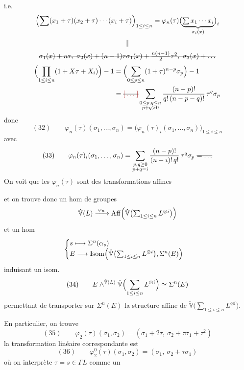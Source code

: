 \documentclass[11pt,a4paper]{article}
\begin{document}
i.e.
\[
\Bigl(\sum (x_1 + \tau)(x_2 + \tau) \cdots (x_i + \tau)\Bigr)_{1 \le i \le n} = \varphi_n(\tau)\bigl(\underbrace{\textstyle\sum x_1 \cdots x_i}_{\sigma_i(x)}\bigr)_i
\]
\[
\Vert
\]
\[
\text{\struck{$\sigma_1(x) + n\tau,\ \sigma_2(x) + (n-1)\tau\sigma_1(x) + \tfrac{n(n-1)}{2}\tau^2,\ \sigma_3(x) + \ldots$}}
\]
\[
\begin{aligned}
\Bigl(\prod_{1 \le i \le n} (1 + X\tau + X_i)\Bigr) - 1 &= \Bigl(\sum_{0 \le p \le n} (1 + \tau)^{n-p}\sigma_p\Bigr) - 1\\
&= \text{\struck{\ill{}}} \sum_{\substack{0 \le p, q \le n\\ p + q > 0}} \frac{(n-p)!}{q!\,(n-p-q)!}\,\tau^q\sigma_p
\end{aligned}
\]
donc
\[
(32)\qquad \varphi_n(\tau)(\sigma_1, \ldots, \sigma_n) = \bigl(\varphi_n(\tau)_i(\sigma_1, \ldots, \sigma_n)\bigr)_{1 \le i \le n}
\]
avec
\[
(33)\qquad \varphi_n(\tau)_i(\sigma_1, \ldots, \sigma_n) = \sum_{\substack{p, q \ge 0\\ p + q = i}} \frac{(n-p)!}{(n-i)!\,q!}\,\tau^q\sigma_p \ \text{\struck{$= \ldots$}}
\]
On voit que les $\varphi_n(\tau)$ sont des transformations affines

et on trouve donc un hom de groupes \struck{\ill{}}
\[
\check{\mathbb{V}}(L) \xrightarrow{\;\varphi_n\;} \mathrm{Aff}\Bigl(\check{\mathbb{V}}\bigl(\textstyle\sum_{1 \le i \le n} L^{\otimes i}\bigr)\Bigr)
\]
et un hom
\[
\begin{cases}
s \longmapsto \Sigma^n(\alpha_s)\\
E \longrightarrow \mathrm{Isom}\Bigl(\check{\mathbb{V}}\bigl(\sum_{1 \le i \le n} L^{\otimes i}\bigr), \Sigma^n(E)\Bigr)
\end{cases}
\]
induisant un  isom.
\[
(34)\qquad E \wedge^{\check{\mathbb{V}}(L)} \check{\mathbb{V}}\Bigl(\sum_{1 \le i \le n} L^{\otimes i}\Bigr) \simeq \Sigma^n(E)
\]
permettant de transporter sur $\Sigma^n(E)$ la structure affine de $\check{\mathbb{V}}\bigl(\sum_{1 \le i \le n} L^{\otimes i}\bigr)$.

En particulier, on trouve
\[
(35)\qquad \varphi_2(\tau)(\sigma_1, \sigma_2) = (\sigma_1 + 2\tau,\ \sigma_2 + \tau\sigma_1 + \tau^2)
\]
la transformation linéaire  correspondante est
\[
(36)\qquad \varphi_2^0(\tau)(\sigma_1, \sigma_2) = (\sigma_1,\ \sigma_2 + \tau\sigma_1)
\]
où on interprète $\tau = s \in \Gamma L$ comme un \ill{}
\end{document}
